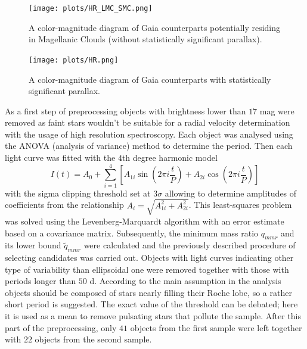 \documentclass{pracalicmgr}
\begin{document}
\begin{figure}[H]
    \begin{center}
        \texttt{[image: plots/HR\_LMC\_SMC.png]}
    \end{center}
    \caption{A color-magnitude diagram of Gaia counterparts potentially residing in Magellanic Clouds (without statistically significant parallax).}
    \label{HR_SMC}
\end{figure}

\begin{figure}[H]
    \begin{center}
        \texttt{[image: plots/HR.png]}
    \end{center}
    \caption{A color-magnitude diagram of Gaia counterparts with statistically significant parallax.}
    \label{HR_galactic}
\end{figure}
As a first step of preprocessing objects with brightness lower than
$17$ mag  were removed as faint stars wouldn't be suitable for a radial velocity determination with the usage of high resolution spectroscopy.
Each object was analysed using the ANOVA (analysis of variance) method \citep{schwarzenberg-czerny_advantage_1989} to determine the period.
Then each light curve was fitted with the $4$th degree harmonic model
\begin{equation}\label{harm}
    I(t)=A_0+\sum_{i=1}^4\left[ A_{1i}\sin{\left(2\pi i\frac{t}{P}\right)}+A_{2i}\cos{\left(2\pi i\frac{t}{P}\right)}\right]
\end{equation}
with the sigma clipping threshold set at $3\sigma$ allowing to determine amplitudes of coefficients from the relationship $A_i=\sqrt{A_{1i}^2+A_{2i}^2}$.
This least-squares problem was solved using the Levenberg-Marquardt algorithm with an error estimate based on a covariance matrix.
Subsequently, the minimum mass ratio $q_{mmr}$ and its lower bound $\tilde{q}_{mmr}$ were calculated and the previously described procedure of selecting candidates was carried out.
Objects with light curves indicating other type of variability than ellipsoidal one were removed together with those with periods longer than
$50$ d. According to the main assumption in the analysis objects should be composed of stars nearly filling their Roche lobe, so a rather short period is suggested. The exact value of the threshold can be debated; here it is used as a mean to
remove pulsating stars that pollute the sample. After this part of the preprocessing, only $41$ objects from the first sample were left together with $22$ objects from the second sample.
\end{document}

